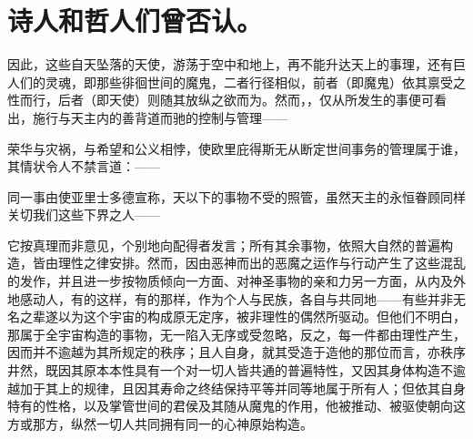 
\section{诗人和哲人们曾否认。}

因此，这些自天坠落的天使，游荡于空中和地上，再不能升达天上的事理，还有巨人们的灵魂，即那些徘徊世间的魔鬼，二者行径相似，前者（即魔鬼）依其禀受之性而行，后者（即天使）则随其放纵之欲而为。然而，，仅从所发生的事便可看出，施行与天主内的善背道而驰的控制与管理——\par

\par

荣华与灾祸，与希望和公义相悖，使欧里庇得斯无从断定世间事务的管理属于谁，其情状令人不禁言道：——\par

\par

同一事由使亚里士多德宣称，天以下的事物不受的照管，虽然天主的永恒眷顾同样关切我们这些下界之人——\par

\par

它按真理而非意见，个别地向配得者发言；所有其余事物，依照大自然的普遍构造，皆由理性之律安排。然而，因由恶神而出的恶魔之运作与行动产生了这些混乱的发作，并且进一步按物质倾向一方面、对神圣事物的亲和力另一方面，从内及外地感动人，有的这样，有的那样，作为个人与民族，各自与共同地——有些并非无名之辈遂以为这个宇宙的构成原无定序，被非理性的偶然所驱动。但他们不明白，那属于全宇宙构造的事物，无一陷入无序或受忽略，反之，每一件都由理性产生，因而并不逾越为其所规定的秩序；且人自身，就其受造于造他的那位而言，亦秩序井然，既因其原本本性具有一个对一切人皆共通的普遍特性，又因其身体构造不逾越加于其上的规律，且因其寿命之终结保持平等并同等地属于所有人；但依其自身特有的性格，以及掌管世间的君侯及其随从魔鬼的作用，他被推动、被驱使朝向这方或那方，纵然一切人共同拥有同一的心神原始构造。\par

